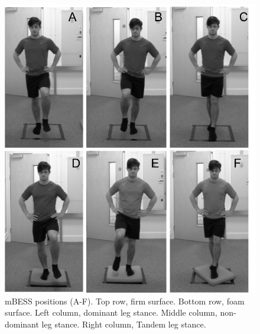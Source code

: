 \documentclass[
  english,
  man,floatsintext]{apa6}
\begin{document}
\begin{figure}[!h]

{\centering \includegraphics[width=\textwidth]{figs/methods/BESS} 

}

\caption{mBESS positions (A-F). Top row, firm surface. Bottom row, foam surface. Left column, dominant leg stance. Middle column, non-dominant leg stance. Right column, Tandem leg stance.}\label{fig:bess-protocol}
\end{figure}
\end{document}
